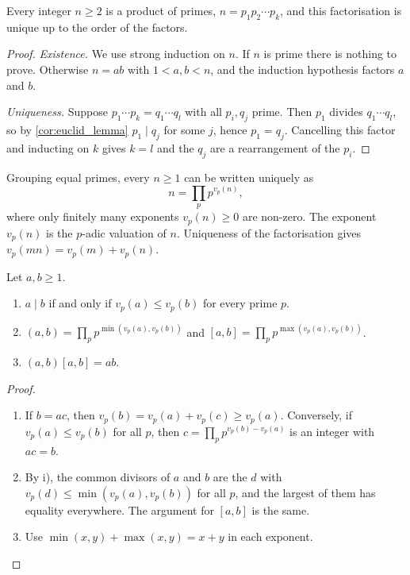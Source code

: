 \begin{theorem}\label{thm:fta}
    Every integer $n \ge 2$ is a product of primes, $n = p_1 p_2 \cdots p_k$, and this factorisation is unique up to the order of the factors.
\end{theorem}
\begin{proof}
    \emph{Existence.} We use strong induction on $n$. If $n$ is prime there is nothing to prove. Otherwise $n = ab$ with $1 < a, b < n$, and the induction hypothesis factors $a$ and $b$.

    \emph{Uniqueness.} Suppose $p_1 \cdots p_k = q_1 \cdots q_l$ with all $p_i, q_j$ prime. Then $p_1$ divides $q_1 \cdots q_l$, so by \cref{cor:euclid_lemma} $p_1 \mid q_j$ for some $j$, hence $p_1 = q_j$. Cancelling this factor and inducting on $k$ gives $k = l$ and the $q_j$ are a rearrangement of the $p_i$.
\end{proof}

Grouping equal primes, every $n \ge 1$ can be written uniquely as
\begin{equation}\label{eq:canonical_factorisation}
    n = \prod_{p} p^{v_p(n)},
\end{equation}
where only finitely many exponents $v_p(n) \ge 0$ are non-zero. The exponent $v_p(n)$ is the $p$-adic valuation of $n$. Uniqueness of the factorisation gives $v_p(mn) = v_p(m) + v_p(n)$.

\begin{corollary}\label{cor:divisors_valuations}
    Let $a,b \ge 1$.
    \begin{enumerate}[label={\upshape\roman*)}]
        \item $a \mid b$ if and only if $v_p(a) \le v_p(b)$ for every prime $p$.
        \item $(a,b) = \prod_p p^{\min(v_p(a), v_p(b))}$ and $[a,b] = \prod_p p^{\max(v_p(a), v_p(b))}$.
        \item $(a,b)[a,b] = ab$.
    \end{enumerate}
\end{corollary}
\begin{proof}
    \begin{enumerate}[label={\upshape\roman*)}]
        \item If $b = ac$, then $v_p(b) = v_p(a) + v_p(c) \ge v_p(a)$. Conversely, if $v_p(a) \le v_p(b)$ for all $p$, then $c = \prod_p p^{v_p(b) - v_p(a)}$ is an integer with $ac = b$.
        \item By i), the common divisors of $a$ and $b$ are the $d$ with $v_p(d) \le \min(v_p(a), v_p(b))$ for all $p$, and the largest of them has equality everywhere. The argument for $[a,b]$ is the same.
        \item Use $\min(x,y) + \max(x,y) = x + y$ in each exponent.
    \end{enumerate}
\end{proof}

